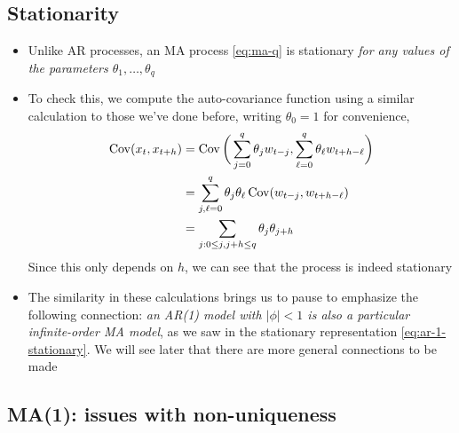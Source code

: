 \documentclass{article}
\begin{document}
\subsection{Stationarity}

\begin{itemize}
\item Unlike AR processes, an MA process \eqref{eq:ma-q} is stationary \emph{for
    any values of the parameters $\theta_1,\dots,\theta_q$}

\item To check this, we compute the auto-covariance function using a similar
  calculation to those we've done before, writing $\theta_0 = 1$ for
  convenience,
  \begin{align}
  \nonumber
  \operatorname{Cov}(x_t, x_{t+h}) &= \operatorname{Cov}\bigg( \sum_{j=0}^q \theta_j w_{t-j}, 
  \sum_{\ell=0}^q \theta_\ell w_{t+h-\ell} \bigg) \\
  \nonumber
  &= \sum_{j,\ell=0}^q \theta_j \theta_\ell \operatorname{Cov}( w_{t-j}, w_{t+h-\ell} ) \\
  \label{eq:ma-q-auto-cov}
  &= \sum_{j : 0 \leq j,  j +h \leq q} \theta_j \theta_{j+h} 
  \end{align}
  Since this only depends on $h$, we can see that the process is indeed
  stationary 

\item The similarity in these calculations brings us to pause to emphasize the
  following connection: \emph{an AR(1) model with $|\phi| < 1$ is also a
    particular infinite-order MA model}, as we saw in the stationary
  representation \eqref{eq:ar-1-stationary}. We will see later that there are
  more general connections to be made
\end{itemize}

\subsection{MA(1): issues with non-uniqueness}
\end{document}
